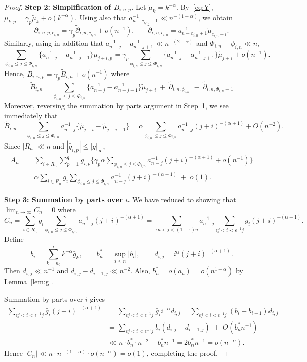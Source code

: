 \documentclass[10pt,a4paper]{amsart}
\newcommand{\eps}{\epsilon}
\begin{document}
\begin{proof}
\vspace{1ex} \noindent
\textbf{Step 2: Simplification of $B_{i,n,p}$.}
Let $\tilde \mu_k=k^{-\alpha}$.
By~\eqref{eq:Y}, 
$\mu_{k,p}=\gamma_p\tilde\mu_k+o(k^{-\alpha})$.
Using also that $a_{n-c_{i,n}+1}^{-1}\ll n^{-(1-\alpha)}$,  
we obtain
\[
\partial_{i,n,p,c_{i,n}} = \gamma_p \tilde\partial_{i,n,c_{i,n}} +o(n^{-1}).
\qquad
\tilde\partial_{i,n,c_{i,n}} =a_{n-c_{i,n}+1}^{-1} \tilde\mu_{c_{i,n}+i}.
\]
Similarly, using in addition that
$a_{n-j}^{-1}-a_{n-j+1}^{-1} \ll
n^{-(2-\alpha)}$ and $\Phi_{i,n}-\phi_{i,n}\ll n$,
\[
\sum_{\phi_{i,n}\le j\le \Phi_{i,n}} \{a_{n-j}^{-1}-a_{n-j+1}^{-1}\}\mu_{j+i,p}
=\gamma_p \sum_{\phi_{i,n}\le j\le \Phi_{i,n}} \{a_{n-j}^{-1}-a_{n-j+1}^{-1}\}\tilde\mu_{j+i}
+o(n^{-1}).
\]
Hence, $B_{i,n,p}=\gamma_p \tilde B_{i,n}+o(n^{-1})$ where
\[
\tilde B_{i,n}  = 
\sum_{\phi_{i,n}\le j\le \Phi_{i,n}} \{a_{n-j}^{-1}-a_{n-j+1}^{-1}\}\tilde\mu_{j+i}
\;+\; \tilde \partial_{i,n,\phi_{i,n}} \;-\; \tilde\partial_{i,n,\Phi_{i,n}+1}
\]
Moreover, reversing the summation by parts argument in Step~1, we see immediately that
\[
\tilde B_{i,n}=
\sum_{\phi_{i,n}\le j\le \Phi_{i,n}} a_{n-j}^{-1}\{\tilde\mu_{j+i}-\tilde\mu_{j+i+1}\}=
\alpha \sum_{\phi_{i,n}\le j\le \Phi_{i,n}} a_{n-j}^{-1}(j+i)^{-(\alpha+1)}
+O(n^{-2}).
\]
Since 
$|R_n|\ll n$ and $|\bar g_{i,p}|\le |g|_\infty$, 
\begin{align*}
A_n & =\sum_{i\in R_n}\sum_{p=1}^q\bar g_{i,p}\Big\{\gamma_p\alpha \sum_{\phi_{i,n}\le j\le \Phi_{i,n}} a_{n-j}^{-1}(j+i)^{-(\alpha+1)} + o(n^{-1})\Big\}
\\ & =\alpha \sum_{i\in R_n}\bar g_i \sum_{\phi_{i,n}\le j\le \Phi_{i,n}} a_{n-j}^{-1}(j+i)^{-(\alpha+1)} \;+\; o(1).
\end{align*}

\vspace{1ex} \noindent
\textbf{Step 3: Summation by parts over $i$.}
We have reduced to showing that $\lim_{n\to\infty}C_n=0$ where
\[
C_n=\sum_{i\in R_n}\bar g_i \sum_{\phi_{i,n}\le j\le \Phi_{i,n}} a_{n-j}^{-1}(j+i)^{-(\alpha+1)} 
=\sum_{\eps n<j<(1-\eps)n} a_{n-j}^{-1}
\sum_{\eps j<i<\eps^{-1}j}\bar g_i (j+i)^{-(\alpha+1)} .
\]
Define
	\[
b_i=\sum_{k=n_0}^i k^{-\alpha}\bar g_k, \qquad  
b_n^*=\sup_{i\le n}|b_i|, \qquad
d_{i,j}= 
i^\alpha(j+i)^{-(\alpha+1)} .
\]
Then $d_{i,j}\ll n^{-1}$ and $d_{i,j}-d_{i+1,j}\ll n^{-2}$.
Also, 
$b_n^*=o(a_n)=o(n^{1-\alpha})$ by Lemma~\ref{lem:g}.

Summation by parts over $i$ gives
\begin{align*}
\sum_{\eps j<i<\eps^{-1}j} \bar g_i (j+i)^{-(\alpha+1)}
& =\sum_{\eps j<i<\eps^{-1}j} \bar g_i i^{-\alpha} d_{i,j}
=\sum_{\eps j<i<\eps^{-1}j} (b_i-b_{i-1}) d_{i,j}
\\ &  =\sum_{\eps j<i<\eps^{-1}j} b_i (d_{i,j}-d_{i+1,j})
\;+\; O(b_n^* n^{-1}) 
\\ &\ll n\cdot b_n^* \cdot n^{-2}+b_n^* n^{-1}=2 b_n^* n^{-1}=o(n^{-\alpha}).
\end{align*}
Hence $|C_n|\ll n\cdot n^{-(1-\alpha)}\cdot o(n^{-\alpha})=o(1)$,
completing the proof.
\end{proof}
\end{document}

